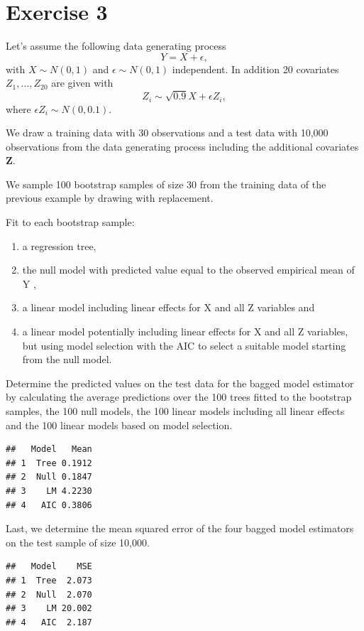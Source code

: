 \documentclass[
]{article}
\begin{document}
\section{Exercise 3}\label{exercise-3}

Let's assume the following data generating process
\[ Y = X + \epsilon, \] with \(X \sim N(0,1)\) and
\(\epsilon \sim N(0,1)\) independent. In addition 20 covariates
\(Z_1, ... ,Z_{20}\) are given with
\[Z_i \sim \sqrt{0.9}X + \epsilon Z_i ,\] where
\(\epsilon Z_i \sim N(0, 0.1).\)

We draw a training data with 30 observations and a test data with 10,000
observations from the data generating process including the additional
covariates \textbf{Z}.

We sample 100 bootstrap samples of size 30 from the training data of the
previous example by drawing with replacement.

Fit to each bootstrap sample:

\begin{enumerate}
\item a regression tree,
\item the null model with predicted value equal to the observed empirical mean of Y ,
\item a linear model including linear effects for X and all Z variables and
\item a linear model potentially including linear effects for X and all Z variables, but using model selection
with the AIC to select a suitable model starting from the null model.
\end{enumerate}

Determine the predicted values on the test data for the bagged model
estimator by calculating the average predictions over the 100 trees
fitted to the bootstrap samples, the 100 null models, the 100 linear
models including all linear effects and the 100 linear models based on
model selection.

\begin{verbatim}
##   Model   Mean
## 1  Tree 0.1912
## 2  Null 0.1847
## 3    LM 4.2230
## 4   AIC 0.3806
\end{verbatim}

Last, we determine the mean squared error of the four bagged model
estimators on the test sample of size 10,000.

\begin{verbatim}
##   Model    MSE
## 1  Tree  2.073
## 2  Null  2.070
## 3    LM 20.002
## 4   AIC  2.187
\end{verbatim}
\end{document}

